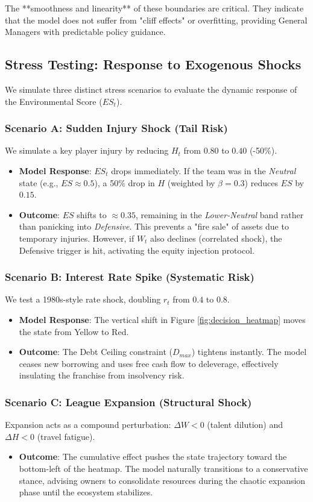 \documentclass{mcmthesis}
\begin{document}
The **smoothness and linearity** of these boundaries are critical. They indicate that the model does not suffer from "cliff effects" or overfitting, providing General Managers with predictable policy guidance.

\subsection{Stress Testing: Response to Exogenous Shocks}
We simulate three distinct stress scenarios to evaluate the dynamic response of the Environmental Score ($ES_t$).

\subsubsection{Scenario A: Sudden Injury Shock (Tail Risk)}
We simulate a key player injury by reducing $H_t$ from $0.80$ to $0.40$ (-50\%).
\begin{itemize}
    \item \textbf{Model Response}: $ES_t$ drops immediately. If the team was in the \textit{Neutral} state (e.g., $ES \approx 0.5$), a 50\% drop in $H$ (weighted by $\beta=0.3$) reduces $ES$ by $0.15$.
    \item \textbf{Outcome}: $ES$ shifts to $\approx 0.35$, remaining in the \textit{Lower-Neutral} band rather than panicking into \textit{Defensive}. This prevents a "fire sale" of assets due to temporary injuries. However, if $W_t$ also declines (correlated shock), the Defensive trigger is hit, activating the equity injection protocol.
\end{itemize}

\subsubsection{Scenario B: Interest Rate Spike (Systematic Risk)}
We test a 1980s-style rate shock, doubling $r_t$ from $0.4$ to $0.8$.
\begin{itemize}
    \item \textbf{Model Response}: The vertical shift in Figure \ref{fig:decision_heatmap} moves the state from Yellow to Red.
    \item \textbf{Outcome}: The Debt Ceiling constraint ($D_{max}$) tightens instantly. The model ceases new borrowing and uses free cash flow to deleverage, effectively insulating the franchise from insolvency risk.
\end{itemize}

\subsubsection{Scenario C: League Expansion (Structural Shock)}
Expansion acts as a compound perturbation: $\Delta W < 0$ (talent dilution) and $\Delta H < 0$ (travel fatigue).
\begin{itemize}
    \item \textbf{Outcome}: The cumulative effect pushes the state trajectory toward the bottom-left of the heatmap. The model naturally transitions to a conservative stance, advising owners to consolidate resources during the chaotic expansion phase until the ecosystem stabilizes.
\end{itemize}
\end{document}
